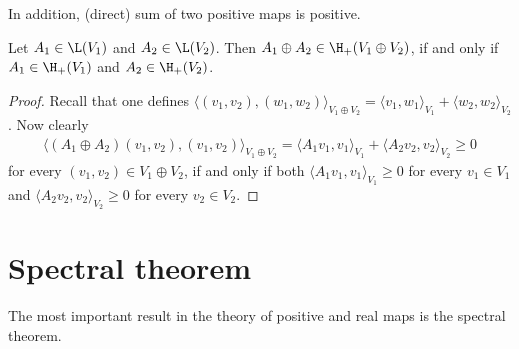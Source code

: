 In addition, (direct) sum of two positive maps is positive.
\begin{lem}\label{direct_product}
	Let $A_{1} \in \L(V_{1})$ and $A_{2} \in \L(V_{2})$. Then $A_{1} \oplus A_{2} \in \H_{+}(V_{1} \oplus V_{2})$, if and only if $A_{1} \in \H_{+}(V_{1})$ and $A_{2} \in \H_{+}(V_{2})$.
\end{lem}
\begin{proof}
	Recall that one defines $\langle(v_{1}, v_{2}), (w_{1}, w_{2}) \rangle_{V_{1} \oplus V_{2}} = \langle v_{1}, w_{1} \rangle_{V_{1}} + \langle w_{2}, w_{2} \rangle_{V_{2}}$. Now clearly
	\begin{align*}
	\langle (A_{1} \oplus A_{2})(v_{1}, v_{2}), (v_{1}, v_{2}) \rangle_{V_{1} \oplus V_{2}} =  \langle A_{1} v_{1}, v_{1} \rangle_{V_{1}} + \langle A_{2} v_{2}, v_{2} \rangle_{V_{2}} \geq 0
	\end{align*}
	for every $(v_{1}, v_{2}) \in V_{1} \oplus V_{2}$, if and only if both $\langle A_{1} v_{1}, v_{1} \rangle_{V_{1}} \geq 0$ for every $v_{1} \in V_{1}$ and $\langle A_{2} v_{2}, v_{2} \rangle_{V_{2}} \geq 0$ for every $v_{2} \in V_{2}$.
\end{proof}

\section{Spectral theorem}

The most important result in the theory of positive and real maps is the spectral theorem.

